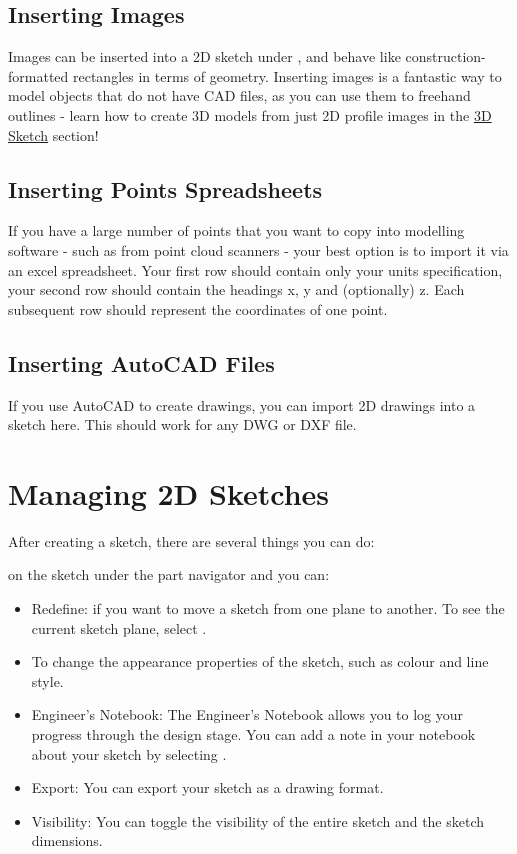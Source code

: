 \begin{enumerate}
\subsection{Inserting Images}
\cbstart
{}
Images can be inserted into a 2D sketch under , and behave like \newline construction-formatted rectangles in terms of geometry. Inserting images is a fantastic way to model objects that do not have CAD files, as you can use them to freehand outlines - learn how to create 3D models from just 2D profile images in the \hyperref[section: 3D Sketches]{3D Sketch} section!

\cbend

\subsection{Inserting Points Spreadsheets}

\cbstart
{}
If you have a large number of points that you want to copy into modelling software - such as from point cloud scanners - your best option is to import it via an excel spreadsheet. Your first row should contain only your units specification, your second row should contain the headings x, y and (optionally) z. Each subsequent row should represent the coordinates of one point.
\cbend

\subsection{Inserting AutoCAD Files}\cbstart
If you use AutoCAD to create drawings, you can import 2D drawings into a sketch here. This should work for any DWG or DXF file.
\cbend
\section{Managing 2D Sketches}

\cbstart
{}

After creating a sketch, there are several things you can do:

 on the sketch under the part navigator and you can:
\begin{itemize}
\item Redefine: if you want to move a sketch from one plane to another. To see the current sketch plane, select .
\item To change the appearance properties of the sketch, such as colour and line style.
\item Engineer's Notebook: The Engineer's Notebook allows you to log your progress through the design stage. You can add a note in your notebook about your sketch by selecting .
\item Export: You can export your sketch as a drawing format.
\item Visibility: You can toggle the visibility of the entire sketch and the sketch dimensions.
\end{itemize}


\end{enumerate}
